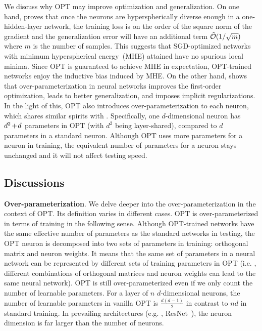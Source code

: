 We discuss why OPT may improve optimization and generalization. On one hand, \cite{xie2016diverse} proves that once the neurons are hyperspherically diverse enough in a one-hidden-layer network, the training loss is on the order of the square norm of the gradient and the generalization error will have an additional term $\thickmuskip=2mu \medmuskip=2mu \tilde{\mathcal{O}}(1/\sqrt{m})$ where $m$ is the number of samples. This suggests that SGD-optimized networks with minimum hyperspherical energy~(MHE) attained have no spurious local minima. Since OPT is guaranteed to achieve MHE in expectation, OPT-trained networks enjoy the inductive bias induced by MHE. On the other hand, \cite{kawaguchi2016deep,allen2018convergence,du2017gradient,li2018algorithmic,gunasekar2017implicit} shows that over-parameterization in neural networks improves the first-order optimization, leads to better generalization, and imposes implicit regularizations. In the light of this, OPT also introduces over-parameterization to each neuron, which shares similar spirits with \cite{lin2013network}. Specifically, one $d$-dimensional neuron has $\thickmuskip=2mu \medmuskip=2mu d^2+d$ parameters in OPT (with $d^2$ being layer-shared), compared to $d$ parameters in a standard neuron. Although OPT uses more parameters for a neuron in training, the equivalent number of parameters for a neuron stays unchanged and it will not affect testing speed. 

\subsection{Discussions}\label{main_discussion}

\textbf{Over-parameterization}. We delve deeper into the over-parameterization in the context of OPT. Its definition varies in different cases. OPT is over-parameterized in terms of training in the following sense. Although OPT-trained networks have the same effective number of parameters as the standard networks in testing, the OPT neuron is decomposed into two sets of parameters in training: orthogonal matrix and neuron weights. It means that the same set of parameters in a neural network can be represented by different sets of training parameters in OPT (i.e. , different combinations of orthogonal matrices and neuron weights can lead to the same neural network). OPT is still over-parameterized even if we only count the number of learnable parameters. For a layer of $n$ $d$-dimensional neurons, the number of learnable parameters in vanilla OPT is $\frac{d(d-1)}{2}$ in contrast to $nd$ in standard training. In prevailing architectures (e.g. , ResNet~\cite{he2016deep}), the neuron dimension is far larger than the number of neurons.

